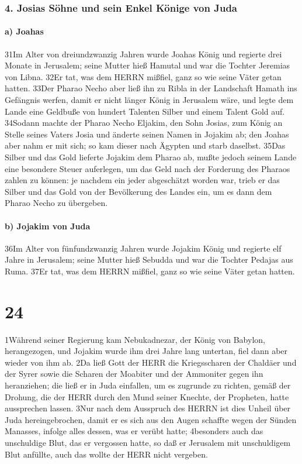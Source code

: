 \hypertarget{josias-suxf6hne-und-sein-enkel-kuxf6nige-von-juda}{%
\subsubsection{4. Josias Söhne und sein Enkel Könige von
Juda}\label{josias-suxf6hne-und-sein-enkel-kuxf6nige-von-juda}}

\hypertarget{a-joahas}{%
\paragraph{a) Joahas}\label{a-joahas}}

31Im Alter von dreiundzwanzig Jahren wurde Joahas König und regierte
drei Monate in Jerusalem; seine Mutter hieß Hamutal und war die Tochter
Jeremias von Libna. 32Er tat, was dem HERRN mißfiel, ganz so wie seine
Väter getan hatten. 33Der Pharao Necho aber ließ ihn zu Ribla in der
Landschaft Hamath ins Gefängnis werfen, damit er nicht länger König in
Jerusalem wäre, und legte dem Lande eine Geldbuße von hundert Talenten
Silber und einem Talent Gold auf. 34Sodann machte der Pharao Necho
Eljakim, den Sohn Josias, zum König an Stelle seines Vaters Josia und
änderte seinen Namen in Jojakim ab; den Joahas aber nahm er mit sich; so
kam dieser nach Ägypten und starb daselbst. 35Das Silber und das Gold
lieferte Jojakim dem Pharao ab, mußte jedoch seinem Lande eine besondere
Steuer auferlegen, um das Geld nach der Forderung des Pharaos zahlen zu
können: je nachdem ein jeder abgeschätzt worden war, trieb er das Silber
und das Gold von der Bevölkerung des Landes ein, um es dann dem Pharao
Necho zu übergeben.

\hypertarget{b-jojakim-von-juda}{%
\paragraph{b) Jojakim von Juda}\label{b-jojakim-von-juda}}

36Im Alter von fünfundzwanzig Jahren wurde Jojakim König und regierte
elf Jahre in Jerusalem; seine Mutter hieß Sebudda und war die Tochter
Pedajas aus Ruma. 37Er tat, was dem HERRN mißfiel, ganz so wie seine
Väter getan hatten.

\hypertarget{section-23}{%
\section{24}\label{section-23}}

1Während seiner Regierung kam Nebukadnezar, der König von Babylon,
herangezogen, und Jojakim wurde ihm drei Jahre lang untertan, fiel dann
aber wieder von ihm ab. 2Da ließ Gott der HERR die Kriegsscharen der
Chaldäer und der Syrer sowie die Scharen der Moabiter und der Ammoniter
gegen ihn heranziehen; die ließ er in Juda einfallen, um es zugrunde zu
richten, gemäß der Drohung, die der HERR durch den Mund seiner Knechte,
der Propheten, hatte aussprechen lassen. 3Nur nach dem Ausspruch des
HERRN ist dies Unheil über Juda hereingebrochen, damit er es sich aus
den Augen schaffte wegen der Sünden Manasses, infolge alles dessen, was
er verübt hatte; 4besonders auch das unschuldige Blut, das er vergossen
hatte, so daß er Jerusalem mit unschuldigem Blut anfüllte, auch das
wollte der HERR nicht vergeben.

